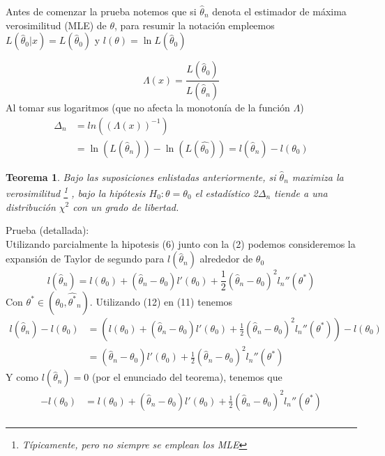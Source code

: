 \documentclass[peerreview]{IEEEtran}
\newtheorem{theorem}{Teorema}
\begin{document}
Antes de comenzar la prueba notemos que si $\hat{\theta}_n$ denota el estimador de máxima verosimilitud (MLE) de $\theta$, para resumir la notación empleemos $L(\hat{\theta}_0|x) = L(\hat{\theta}_0)$ y $l(\theta) = \ln L(\hat{\theta}_0)$

\[
\Lambda(x) = \frac{L(\hat{\theta}_0)}{L(\hat{\theta}_n)}
\]
Al tomar sus logaritmos (que no afecta la monotonía de la función $\Lambda$)
\begin{equation}
\begin{split}
\Delta_n  &=  ln \left( (\Lambda(x) )^{-1} \right)\\ &= \ln ( L(\hat{\theta}_n) )- \ln \left( L(\hat{\theta_0}) \right) = l(\hat{\theta}_n) -l({\theta}_0)
\end{split}
\end{equation}
\begin{theorem}
Bajo las suposiciones enlistadas anteriormente, si $\hat{\theta}_n$ maximiza la verosimilitud \footnote{ Típicamente, pero no siempre se emplean los MLE} , bajo la hipótesis $H_0: \theta = \theta_0$ el estadístico 2$\Delta_n$ tiende a una distribución $\chi^2$ con un grado de libertad.
\end{theorem}
Prueba (detallada): \\
Utilizando parcialmente la hipotesis (6) junto con la (2) podemos consideremos la expansión de Taylor de segundo para $l(\hat{\theta}_n)$ alrededor de $\theta_0$   
\begin{equation}
l(\hat{\theta}_n) = l(\theta_0) +(\hat{\theta}_n - \theta_0)l'(\theta_0) + \frac{1}{2}(\hat{\theta}_n - \theta_0)^2l_n''(\theta^*)
\end{equation}
Con $\theta^* \in (\theta_0, \hat{\theta^*}_n)$. Utilizando (12) en (11) tenemos 
\begin{equation}
\begin{split}
l(\hat{\theta}_n) -l({\theta}_0) &=
( l(\theta_0) +(\hat{\theta}_n - \theta_0)l'(\theta_0) + \frac{1}{2}(\hat{\theta}_n - \theta_0)^2l_n''(\theta^*) )-l({\theta}_0)\\
& = (\hat{\theta}_n - \theta_0)l'(\theta_0) + \frac{1}{2}(\hat{\theta}_n - \theta_0)^2l_n''(\theta^*)
\end{split}
\end{equation}
Y como $l(\hat{\theta}_n) = 0$ (por el enunciado del teorema), tenemos que 
\begin{equation*}
\begin{split}
-l({\theta}_0) &=
 l(\theta_0) +(\hat{\theta}_n - \theta_0)l'(\theta_0) + \frac{1}{2}(\hat{\theta}_n - \theta_0)^2l_n''(\theta^*) \\
\end{split}
\end{equation*}
\end{document}
